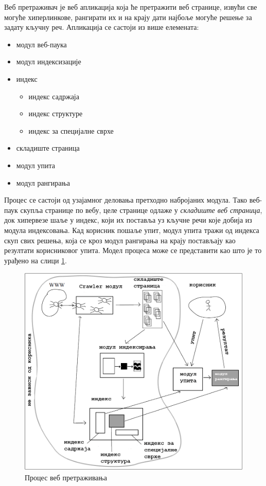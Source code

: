 Веб претраживач је веб апликација која ће претражити веб странице, извући све могуће хиперлинкове, рангирати их и на крају дати најбоље могуће решење за задату кључну реч. Апликација се састоји из више елемената:
\begin{itemize}
\item модул веб-паука
\item модул индексизације
\item индекс
      \begin{itemize}
      \item индекс садржаја
      \item индекс структуре
      \item индекс за специјалне сврхе 
      \end{itemize}
\item складиште страница
\item модул упита
\item модул рангирања

\end{itemize}

Процес се састоји од узајамног деловања претходно набројаних модула. Тако веб-паук скупља странице по вебу, целе странице одлаже у \emph{складиште веб страница}, док хипервезе шаље у индекс, који их поставља уз кључне речи које добија из модула индексовања. Кад корисник пошаље упит, модул упита тражи од индекса скуп свих решења, која се кроз модул рангирања на крају постављају као резултати корисниковог упита. Модел процеса може се представити као што је то урађено на слици  \ref{slike:crawling}.
\begin{figure}
\centering
\includegraphics[scale=0.5]{crawling.png}
\caption{Процес веб претраживања \cite[Ch 1.3.2]{langville2011google}}
\label{slike:crawling}
\end{figure}

